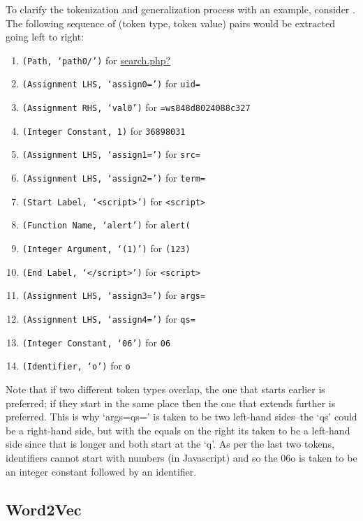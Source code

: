 To clarify the tokenization and generalization process with an example, consider . The following sequence of (token type, token value) pairs would be extracted going left to right:

\begin{enumerate}
\item \texttt{(Path, `path0/')} for \url{search.php?}
\item \texttt{(Assignment LHS, `assign0=')} for \texttt{uid=}
\item \texttt{(Assignment RHS, `val0')} for \texttt{=ws848d8024088c327}
\item \texttt{(Integer Constant, 1)} for \texttt{36898031}
\item \texttt{(Assignment LHS, `assign1=')} for \texttt{src=}
\item \texttt{(Assignment LHS, `assign2=')} for \texttt{term=}
\item \texttt{(Start Label, `<script>')} for \texttt{<script>}
\item \texttt{(Function Name, `alert')} for \texttt{alert(}
\item \texttt{(Integer Argument, `(1)')} for \texttt{(123)}
\item \texttt{(End Label, `</script>')} for \texttt{<script>}
\item \texttt{(Assignment LHS, `assign3=')} for \texttt{args=}
\item \texttt{(Assignment LHS, `assign4=')} for \texttt{qs=}
\item \texttt{(Integer Constant, `06')} for \texttt{06}
\item \texttt{(Identifier, `o')} for \texttt{o}
\end{enumerate}

Note that if two different token types overlap, the one that starts earlier is preferred; if they start in the same place then the one that extends further is preferred. This is why `args=qs=' is taken to be two left-hand sides--the `qs' could be a right-hand side, but with the equals on the right its taken to be a left-hand side since that is longer and both start at the `q'. As per the last two tokens, identifiers cannot start with numbers  (in Javascript) and so the 06o is taken to be an integer constant followed by an identifier.


\subsection{Word2Vec}



